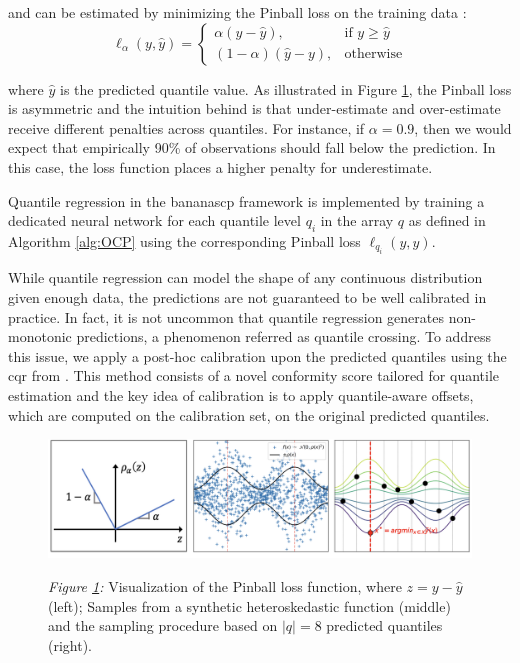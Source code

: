 {\begin{description}[leftmargin=0cm, listparindent=\parindent]
	\noindent and can be estimated by minimizing the Pinball loss on the training data \cite{koenker1978regression}:
		\begin{equation}
			\ell_\alpha(y, \hat{y}) = 
			\begin{cases}
			\alpha (y - \hat{y}), & \text{if } y \geq \hat{y} \\
			(1 - \alpha)(\hat{y} - y), & \text{otherwise}
			\end{cases}
		\label{pinballloss}
		\end{equation}
		
	\noindent where $\hat{y}$ is the predicted quantile value.	 As illustrated in Figure \ref{fig:CQR}, the Pinball loss is asymmetric and the intuition behind is that under-estimate and over-estimate receive different penalties across quantiles. 	For instance, if $\alpha=0.9$, then we would expect that empirically 90\% of observations should fall below the prediction. In this case, the loss function places a higher penalty for underestimate.	
	
	Quantile regression in the \gls{bananascp} framework is implemented by training a dedicated neural network for each quantile level $q_i$ in the array $q$ as defined in Algorithm \ref{alg:OCP} using the corresponding Pinball loss $\ell_{q_i}(y, \hat{y})$. 
	
	 While quantile regression can model the shape of any continuous distribution given enough data, the predictions are not guaranteed to be well calibrated in practice. In fact, it is not uncommon that quantile regression generates non-monotonic predictions, a phenomenon referred as quantile crossing. To address this issue, we apply a post-hoc calibration upon the predicted quantiles using the \gls{cqr} from \cite{romano2019conformalized}. This method consists of a novel conformity score tailored for quantile estimation and the key idea of calibration is to apply quantile-aware offsets, which are computed on the calibration set, on the original predicted quantiles. 
		 
	 \begin{figure}[t]	
		\includegraphics[scale=0.56]{figs/pinball_loss_and_CQR.png}
		\label{fig:CQR}
		{\small \textit{Figure \ref{fig:CQR}:} Visualization of the Pinball loss function, where $z=y - \hat{y}$ \cite{romano2019conformalized} (left); Samples from a synthetic heteroskedastic function (middle) and  the sampling procedure based on $|q| = 8$ predicted quantiles \cite{salinas2023optimizing} (right).
		}
	\end{figure}
	 

\end{description}}

